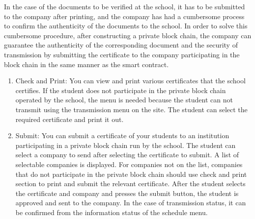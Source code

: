 \documentclass[conference]{IEEEtran}
\begin{document}
\begin{enumerate}
        In the case of the documents to be verified at the school, it has to be submitted to the company after printing, and the company has had a cumbersome process to confirm the authenticity of the documents to the school. In order to solve this cumbersome procedure, after constructing a private block chain, the company can guarantee the authenticity of the corresponding document and the security of transmission by submitting the certificate to the company participating in the block chain in the same manner as the smart contract.\\
    \begin{enumerate}
    	\item Check and Print: You can view and print various certificates that the school certifies. If the student does not participate in the private block chain operated by the school, the menu is needed because the student can not transmit using the transmission menu on the site. The student can select the required certificate and print it out.\\
        \item Submit: You can submit a certificate of your students to an institution participating in a private block chain run by the school. The student can select a company to send after selecting the certificate to submit. A list of selectable companies is displayed. For companies not on the list, companies that do not participate in the private block chain should use check and print section to print and submit the relevant certificate. After the student selects the certificate and company and presses the submit button, the student is approved and sent to the company. In the case of transmission status, it can be confirmed from the information status of the schedule menu.
    \end{enumerate}
\end{enumerate}
\end{document}
